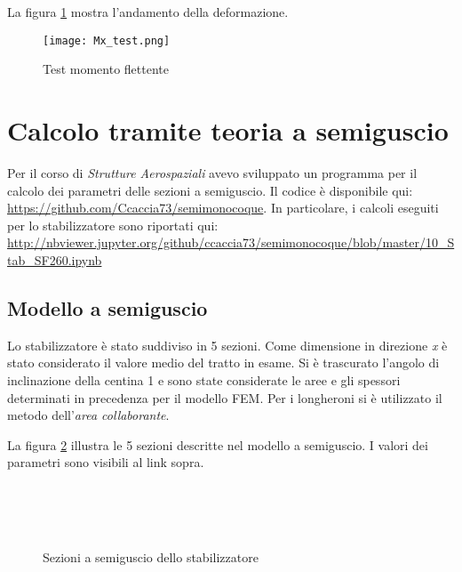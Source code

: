 \documentclass[
10pt, %
a4paper, %
oneside, %
headinclude,footinclude, %
BCOR5mm, %
]{scrartcl}
\begin{document}
La figura \ref{fig:Mxtest} mostra l'andamento della deformazione.

\begin{figure}[htb]
	\centering 
	\texttt{[image: Mx\_test.png]} 
	\caption[Test Mx]{Test momento flettente} %
	\label{fig:Mxtest} 
\end{figure}

\newpage

\section{Calcolo tramite teoria a semiguscio}

Per il corso di \emph{Strutture Aerospaziali} avevo sviluppato un programma per il calcolo dei parametri delle sezioni a semiguscio. Il codice è disponibile qui: \url{https://github.com/Ccaccia73/semimonocoque}. In particolare, i calcoli eseguiti per lo stabilizzatore sono riportati qui: \url{http://nbviewer.jupyter.org/github/ccaccia73/semimonocoque/blob/master/10_Stab_SF260.ipynb}

\subsection{Modello a semiguscio}

Lo stabilizzatore è stato suddiviso in 5 sezioni. Come dimensione in direzione \emph{x} è stato considerato il valore medio del tratto in esame. Si è trascurato l'angolo di inclinazione della centina 1 e sono state considerate le aree e gli spessori determinati in precedenza per il modello FEM. Per i longheroni si è utilizzato il metodo dell'\emph{area collaborante}.

La figura \ref{fig:semiguscio} illustra le 5 sezioni descritte nel modello a semiguscio. I valori dei parametri sono visibili al link sopra.


\begin{figure}[tb]
	\centering
	 \quad
	 \\
	 \quad
	 \\
	 \\
	\caption[modello a semiguscio]{Sezioni a semiguscio dello stabilizzatore} %
	\label{fig:semiguscio}
\end{figure}
\end{document}
